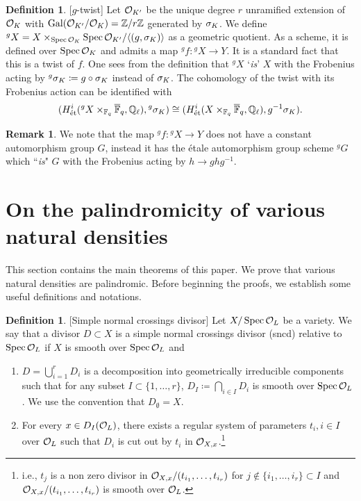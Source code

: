 \documentclass[10pt]{article}
\theoremstyle{plain}
\theoremstyle{definition}
\newtheorem{definition}[theorem]{Definition}
\newtheorem{remark}[theorem]{Remark}
\numberwithin{equation}{section}
\begin{document}
\begin{definition}\label{defn: unramified twist by an element}[$g$-twist]
Let $\mathcal O_{K'}$ be the unique degree $r$ unramified extension of ${{\mathcal O}_{K}}$ with $\operatorname{Gal}(\mathcal O_{K'}/{{\mathcal O}_{K}}) = \mathbb Z/r\mathbb Z$ generated by $\sigma_K$. We define $^gX = X\times_{\operatorname{Spec} {{\mathcal O}_{K}}}\operatorname{Spec} \mathcal O_{K'}/\langle(g,\sigma_K)\rangle$ as a geometric quotient. As a scheme, it is defined over $\operatorname{Spec} {{\mathcal O}_{K}}$ and admits a map $^gf: {^gX} \to Y$. It is a standard fact that this is a twist of $f$. One sees from the definition that $^gX$ `\emph{is}' $X$ with the Frobenius acting by ${^g\sigma_K} \coloneqq g\circ\sigma_K$ instead of $\sigma_K$. The cohomology of the twist with its Frobenius action can be identified with
\[(H^i_{\text{\'et}}({^gX}\times_{\mathbb F_q}\overline{\mathbb F}_q,\mathbb Q_\ell) , {^g\sigma_K}) \cong (H^i_{\text{\'et}}({X}\times_{\mathbb F_q}\overline{\mathbb F}_q,\mathbb Q_\ell) , {g^{-1}\sigma_K}). \]

\end{definition}

\begin{remark}
We note that the map $^gf: {^gX} \to Y$ does not have a constant automorphism group $G$, instead it has the \'etale automorphism group scheme $^gG$ which ``\emph{is}" $G$ with the Frobenius acting by $h \to ghg^{-1}$.
\end{remark}



\section{On the palindromicity of various natural densities}\label{section: on the palindromicity}

This section contains the main theorems of this paper. We prove that various natural densities are palindromic. Before beginning the proofs, we establish some useful definitions and notations. 


\begin{definition}\label{defn: sncd}[Simple normal crossings divisor]
Let $X/\operatorname{Spec} {{\mathcal O}_{L}}$ be a variety. We say that a divisor $D \subset X$ is a simple normal crossings divisor (sncd) relative to $\operatorname{Spec} {{\mathcal O}_{L}}$ if $X$ is smooth over $\operatorname{Spec} {{\mathcal O}_{L}}$ and
\begin{enumerate}
    \item $D = \bigcup_{i=1}^{r} D_i$ is a decomposition into geometrically irreducible components such that for any subset $I \subset \{1,\dots,r\}$, $D_I \coloneqq \bigcap_{i \in I}D_i$ is smooth over $\operatorname{Spec} {{\mathcal O}_{L}}$. We use the convention that $D_{\emptyset} = X$.
    \item For every $x \in D_I({{\mathcal O}_{L}})$, there exists a regular system of parameters $t_i, i\in I$ over ${{\mathcal O}_{L}}$ such that $D_i$ is cut out by $t_i$ in ${\mathcal O}_{X,x}$.\footnote{i.e., $t_{j}$ is a non zero divisor in ${\mathcal O}_{X,x}/(t_{i_1},\dots,t_{i_r})$ for $j \not\in \{i_1,\dots,i_r\} \subset I$ and ${\mathcal O}_{X,x}/(t_{i_1},\dots,t_{i_r})$ is smooth over ${{\mathcal O}_{L}}$.}
\end{enumerate}
\end{definition}
\end{document}
